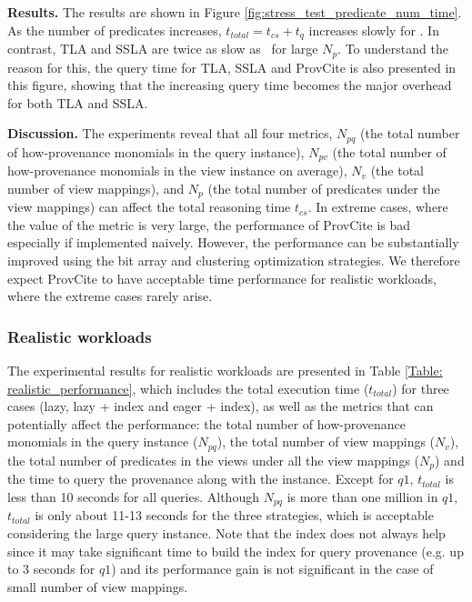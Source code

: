\textbf{Results.} The results are shown in Figure \ref{fig:stress_test_predicate_num_time}. As the number of predicates increases, $t_{total}=t_{cs} + t_q$
increases slowly for \provalg. In contrast, TLA and SSLA are twice as slow as \provalg\ for large $N_p$. To understand the reason for this, the query time for TLA, SSLA and ProvCite is also presented in this figure, showing that the increasing query time becomes the major overhead for both TLA and SSLA. %

{\bf Discussion.} The experiments reveal that all four metrics, $N_{pq}$ (the total number of how-provenance monomials in the query instance), $N_{pv}$ (the total number of how-provenance monomials in the view instance on average), $N_v$ (the total number of view mappings), and $N_p$ (the total number of predicates under the view mappings) can affect the total reasoning time $t_{cs}$. In extreme cases, where the value of the metric is very large, the performance of ProvCite is bad especially if implemented naively. However, the performance can be substantially improved using the bit array and clustering optimization strategies. We therefore expect ProvCite to have acceptable time performance for realistic workloads, where the extreme cases rarely arise. 

\subsubsection{Realistic workloads}
\label{ssec: realistic}
The experimental results for realistic workloads are presented in Table \ref{Table: realistic_performance}, which includes the total execution time ($t_{total}$) for three cases (lazy, lazy + index and eager + index), as well as the metrics that can potentially affect the performance: the total number of how-provenance monomials in the query instance ($N_{pq}$), the total number of view mappings ($N_v$), the total number of predicates in the views under all the view mappings ($N_p$) and the time to query the provenance along with the instance. Except for $q1$, $t_{total}$ is less than 10 seconds for all queries. Although $N_{pq}$ is more than one million in $q1$, $t_{total}$ is only about 11-13 seconds for the three strategies, which is acceptable considering the large query instance. Note that the index does not always help since it may take significant time to build the index for query provenance (e.g. up to 3 seconds for $q1$) and its performance gain is not significant in the case of small number of view mappings.

